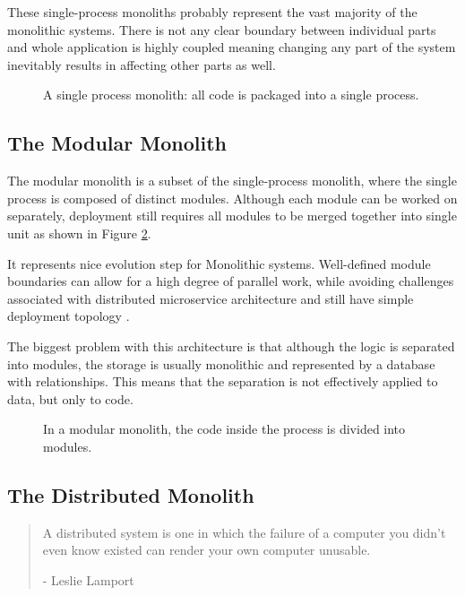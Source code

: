These single-process monoliths probably represent the vast majority of the monolithic systems. There is not any clear boundary between individual parts and whole application is highly coupled \cite{EVOLUTIONARY_ARCHITERUES_COUPLING} meaning changing any part of the system inevitably results in affecting other parts as well.

\begin{figure}
    \centering
    
    \caption{A single process monolith: all code is packaged into a single process. \cite{MON_TO_MS_MONOLITH}\label{img:monolith_single_process}}
\end{figure}


\subsection{The Modular Monolith}
\label{section:modular_monolith}

The modular monolith is a subset of the single-process monolith, where the single process is composed of distinct modules. Although each module can be worked on separately, deployment still requires all modules to be merged together into single unit as shown in Figure \ref{img:monolith_single_process_modular}. \cite{BUILDING_MS_MONOLITH}

It represents nice evolution step for Monolithic systems. Well-defined module boundaries can allow for a high degree of parallel work, while avoiding challenges associated with distributed microservice architecture and still have simple deployment topology \cite{BUILDING_MS_MONOLITH}.

The biggest problem with this architecture is that although the logic is separated into modules, the storage is usually monolithic and represented by a database with relationships. This means that the separation is not effectively applied to data, but only to code.


\begin{figure}
    \centering
    
    \caption{In a modular monolith, the code inside the process is divided into modules. \cite{BUILDING_MS_MONOLITH}\label{img:monolith_single_process_modular}}
\end{figure}


\subsection{The Distributed Monolith}
\begin{quote}
    A distributed system is one in which the failure of a computer you didn’t even know existed can render your own computer unusable. \cite{lamport1987distribution}
    \begin{flushright}
        - Leslie Lamport
    \end{flushright}
\end{quote}


